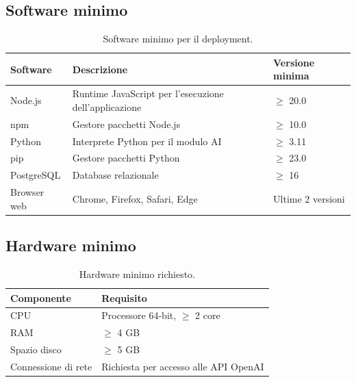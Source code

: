 \documentclass[a4paper, 11pt, oneside]{scrartcl}
\begin{document}
\subsection{Software minimo}
\begin{table}[H]
    \centering
    \renewcommand{\arraystretch}{1.2}
    \begin{tabularx}{\textwidth}{@{}lXl@{}}
        \toprule
        \textbf{Software} & \textbf{Descrizione}                                  & \textbf{Versione minima} \\
        \midrule
        Node.js           & Runtime JavaScript per l'esecuzione dell'applicazione & $\geq$ 20.0              \\
        npm               & Gestore pacchetti Node.js                             & $\geq$ 10.0              \\
        Python            & Interprete Python per il modulo AI                    & $\geq$ 3.11              \\
        pip               & Gestore pacchetti Python                              & $\geq$ 23.0              \\
        PostgreSQL        & Database relazionale                                  & $\geq$ 16                \\
        Browser web       & Chrome, Firefox, Safari, Edge                         & Ultime 2 versioni        \\
        \bottomrule
    \end{tabularx}
    \caption{Software minimo per il deployment.}
\end{table}

\subsection{Hardware minimo}
\begin{table}[H]
    \centering
    \renewcommand{\arraystretch}{1.2}
    \begin{tabularx}{\textwidth}{@{}lX@{}}
        \toprule
        \textbf{Componente} & \textbf{Requisito}                    \\
        \midrule
        CPU                 & Processore 64-bit, $\geq$ 2 core      \\
        RAM                 & $\geq$ 4 GB                           \\
        Spazio disco        & $\geq$ 5 GB                           \\
        Connessione di rete & Richiesta per accesso alle API OpenAI \\
        \bottomrule
    \end{tabularx}
    \caption{Hardware minimo richiesto.}
\end{table}
\end{document}
